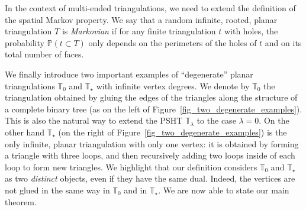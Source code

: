 \documentclass[10pt]{amsart}
\theoremstyle{definition}\newtheorem{defi}[theo]{Definition}\newtheorem{rema}[theo]{Remark}\newtheorem{exam}[theo]{Example}\newtheorem{exem}[theo]{Example}\newtheorem{nota}[theo]{Notation}
\newcommand{\TT}{\mathbb{T}}
\renewcommand{\P}{\mathbb{P}}
\begin{document}
In the context of multi-ended triangulations, we need to extend the definition of the spatial Markov property. We say that a random infinite, rooted, planar triangulation $T$ is \emph{Markovian} if for any finite triangulation $t$ with holes, the probability $\P (t \subset T)$ only depends on the perimeters of the holes of $t$ and on its total number of faces.

We finally introduce two important examples of ``degenerate'' planar triangulations $\TT_0$ and $\TT_{\star}$ with infinite vertex degrees. We denote by $\TT_0$ the triangulation obtained by gluing the edges of the triangles along the structure of a complete binary tree (as on the left of Figure~\ref{fig_two_degenerate_examples}). This is also the natural way to extend the PSHT $\TT_{\lambda}$ to the case $\lambda=0$. On the other hand $\TT_{\star}$ (on the right of Figure~\ref{fig_two_degenerate_examples}) is the only infinite, planar triangulation with only one vertex: it is obtained by forming a triangle with three loops, and then recursively adding two loops inside of each loop to form new triangles. We highlight that our definition considers $\TT_0$ and $\TT_{\star}$ as two \emph{distinct} objects, even if they have the same dual. Indeed, the vertices are not glued in the same way in $\TT_0$ and in $\TT_{\star}$. We are now able to state our main theorem.
\end{document}
